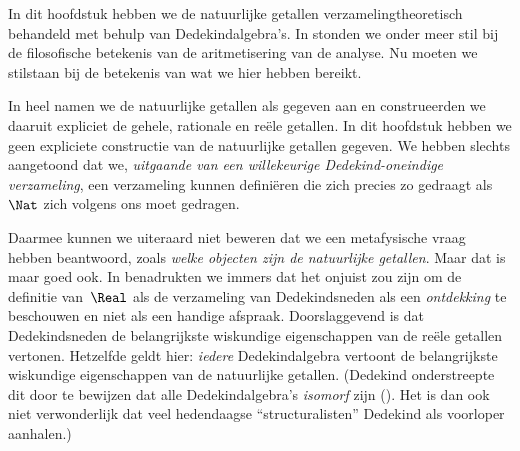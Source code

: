 \documentclass[../../../include/open-logic-section]{subfiles}
\begin{document}


In dit hoofdstuk hebben we de natuurlijke getallen
verzamelingtheoretisch behandeld met behulp van Dedekindalgebra's. In
 stonden we onder meer stil bij de filosofische
betekenis van de aritmetisering van de analyse. Nu moeten we stilstaan
bij de betekenis van wat we hier hebben bereikt.

In heel  namen we de natuurlijke getallen als
gegeven aan en construeerden we daaruit expliciet de gehele, rationale
en reële getallen. In dit hoofdstuk hebben we geen expliciete
constructie van de natuurlijke getallen gegeven. We hebben slechts
aangetoond dat we, \emph{uitgaande van een willekeurige
Dedekind-oneindige verzameling}, een verzameling kunnen definiëren die zich precies zo
gedraagt als~$\Nat$ zich volgens ons moet gedragen.

Daarmee kunnen we uiteraard niet beweren dat we een metafysische vraag
hebben beantwoord, zoals \emph{welke objecten zijn de natuurlijke
getallen}. Maar dat is maar goed ook. In
 benadrukten we immers dat het onjuist zou
zijn om de definitie van~$\Real$ als de verzameling van Dedekindsneden
als een \emph{ontdekking} te beschouwen en niet als een handige afspraak.
Doorslaggevend is dat Dedekindsneden de belangrijkste wiskundige
eigenschappen van de reële getallen vertonen. Hetzelfde geldt hier:
\emph{iedere} Dedekindalgebra vertoont de belangrijkste wiskundige
eigenschappen van de natuurlijke getallen. (Dedekind onderstreepte dit
door te bewijzen dat alle Dedekindalgebra's \emph{isomorf} zijn
(\citeyear[stellingen 132--3]{Dedekind1888}). Het is dan ook niet
verwonderlijk dat veel hedendaagse ``structuralisten'' Dedekind als
voorloper aanhalen.)
\end{document}
